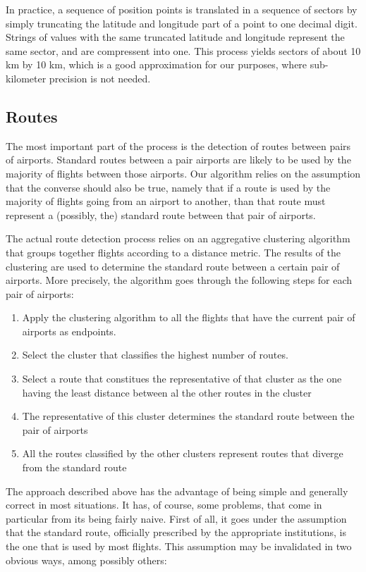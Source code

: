 \documentclass{vldb}
\begin{document}
In practice, a sequence of position points is translated in a sequence of
sectors by simply truncating the latitude and longitude part of a point to one
decimal digit. Strings of values with the same truncated latitude and
longitude represent the same sector, and are compressent into one. This process
yields sectors of about 10 km by 10 km, which is a good approximation for our
purposes, where sub-kilometer precision is not needed.

\subsection{Routes}

The most important part of the process is the detection of routes between pairs
of airports. Standard routes between a pair airports are likely to be used by
the majority of flights between those airports. Our algorithm relies on the
assumption that the converse should also be true, namely that if a route is used
by the majority of flights going from an airport to another, than that route
must represent a (possibly, the) standard route between that pair of airports.

The actual route detection process relies on an aggregative clustering algorithm
that groups together flights according to a distance metric. The results of the
clustering are used to determine the standard route between a certain pair of
airports. More precisely, the algorithm goes through the following steps for
each pair of airports:

\begin{enumerate}
  \item Apply the clustering algorithm to all the flights that have the
  current pair of airports as endpoints.
  \item Select the cluster that classifies the highest number of routes.
  \item Select a route that constitues the representative of
  that cluster as the one having the least distance between al the other
  routes in the cluster
  \item The representative of this cluster determines the standard route
  between the pair of airports
  \item All the routes classified by the other clusters represent routes that
  diverge from the standard route
\end{enumerate}

The approach described above has the advantage of being simple and generally
correct in most situations. It has, of course, some problems, that come in
particular from its being fairly naive. First of all, it goes under the
assumption that the standard route, officially prescribed by the
appropriate institutions, is the one that is used by most flights. This
assumption may be invalidated in two obvious ways, among possibly others:
\end{document}
